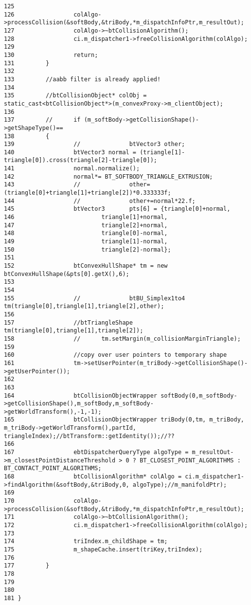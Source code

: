 \begin{Code}
\begin{verbatim}
125 
126                 colAlgo->processCollision(&softBody,&triBody,*m_dispatchInfoPtr,m_resultOut);
127                 colAlgo->~btCollisionAlgorithm();
128                 ci.m_dispatcher1->freeCollisionAlgorithm(colAlgo);
129                 
130                 return;
131         }
132 
133         //aabb filter is already applied!       
134 
135         //btCollisionObject* colObj = static_cast<btCollisionObject*>(m_convexProxy->m_clientObject);
136 
137         //      if (m_softBody->getCollisionShape()->getShapeType()==
138         {
139                 //              btVector3 other;
140                 btVector3 normal = (triangle[1]-triangle[0]).cross(triangle[2]-triangle[0]);
141                 normal.normalize();
142                 normal*= BT_SOFTBODY_TRIANGLE_EXTRUSION;
143                 //              other=(triangle[0]+triangle[1]+triangle[2])*0.333333f;
144                 //              other+=normal*22.f;
145                 btVector3       pts[6] = {triangle[0]+normal,
146                         triangle[1]+normal,
147                         triangle[2]+normal,
148                         triangle[0]-normal,
149                         triangle[1]-normal,
150                         triangle[2]-normal};
151 
152                 btConvexHullShape* tm = new btConvexHullShape(&pts[0].getX(),6);
153 
154 
155                 //              btBU_Simplex1to4 tm(triangle[0],triangle[1],triangle[2],other);
156 
157                 //btTriangleShape tm(triangle[0],triangle[1],triangle[2]);      
158                 //      tm.setMargin(m_collisionMarginTriangle);
159 
160                 //copy over user pointers to temporary shape
161                 tm->setUserPointer(m_triBody->getCollisionShape()->getUserPointer());
162 
163                 
164                 btCollisionObjectWrapper softBody(0,m_softBody->getCollisionShape(),m_softBody,m_softBody->getWorldTransform(),-1,-1);
165                 btCollisionObjectWrapper triBody(0,tm, m_triBody, m_triBody->getWorldTransform(),partId, triangleIndex);//btTransform::getIdentity());//??
166 
167                 ebtDispatcherQueryType algoType = m_resultOut->m_closestPointDistanceThreshold > 0 ? BT_CLOSEST_POINT_ALGORITHMS : BT_CONTACT_POINT_ALGORITHMS;
168                 btCollisionAlgorithm* colAlgo = ci.m_dispatcher1->findAlgorithm(&softBody,&triBody,0, algoType);//m_manifoldPtr);
169 
170                 colAlgo->processCollision(&softBody,&triBody,*m_dispatchInfoPtr,m_resultOut);
171                 colAlgo->~btCollisionAlgorithm();
172                 ci.m_dispatcher1->freeCollisionAlgorithm(colAlgo);
173 
174                 triIndex.m_childShape = tm;
175                 m_shapeCache.insert(triKey,triIndex);
176 
177         }
178 
179 
180 
181 }
\end{verbatim}
\end{Code}




